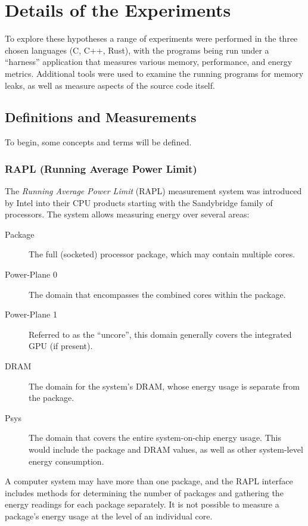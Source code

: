 \section{Details of the Experiments}
\label{sec:experiments}

To explore these hypotheses a range of experiments were performed in the three chosen languages (C, C++, Rust), with the programs being run under a ``harness'' application that measures various memory, performance, and energy metrics. Additional tools were used to examine the running programs for memory leaks, as well as measure aspects of the source code itself.

\subsection{Definitions and Measurements}

To begin, some concepts and terms will be defined.

\subsubsection{RAPL (Running Average Power Limit)}

The \textit{Running Average Power Limit} (RAPL) measurement system was introduced by Intel into their CPU products starting with the Sandybridge family of processors. The system allows measuring energy over several areas:

\begin{description}
\item[Package] The full (socketed) processor package, which may contain multiple cores.
\item[Power-Plane 0] The domain that encompasses the combined cores within the package.
\item[Power-Plane 1] Referred to as the ``uncore'', this domain generally covers the integrated GPU (if present).
\item[DRAM] The domain for the system's DRAM, whose energy usage is separate from the package.
\item[Psys] The domain that covers the entire system-on-chip energy usage. This would include the package and DRAM values, as well as other system-level energy consumption.
\end{description}

A computer system may have more than one package, and the RAPL interface includes methods for determining the number of packages and gathering the energy readings for each package separately. It is not possible to measure a package's energy usage at the level of an individual core.

